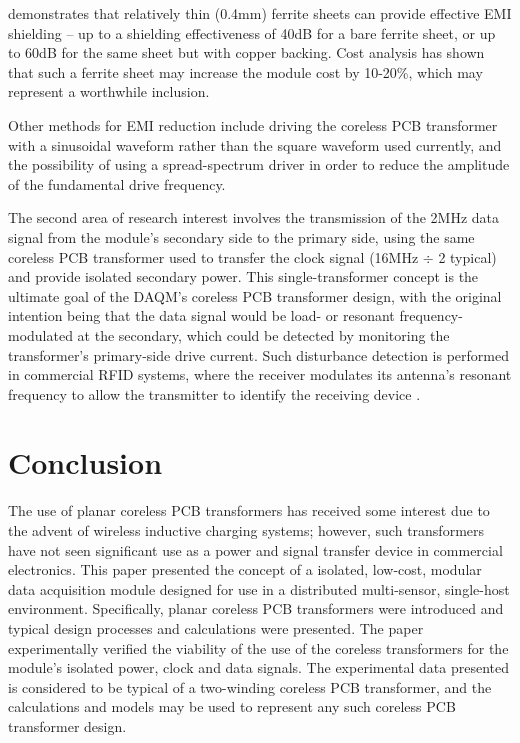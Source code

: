 \documentclass[conference]{IEEEtran}
\begin{document}
\cite{EMIShield} demonstrates that relatively thin (0.4mm) ferrite sheets can provide effective EMI shielding -- up to a shielding effectiveness of 40dB for a bare ferrite sheet, or up to 60dB for the same sheet but with copper backing.  Cost analysis has shown that such a ferrite sheet may increase the module cost by 10-20\%, which may represent a worthwhile inclusion.

Other methods for EMI reduction include driving the coreless PCB transformer with a sinusoidal waveform rather than the square waveform used currently, and the possibility of using a spread-spectrum driver in order to reduce the amplitude of the fundamental drive frequency.

The second area of research interest involves the transmission of the 2MHz data signal from the module's secondary side to the primary side, using the same coreless PCB transformer used to transfer the clock signal (16MHz $ \div $ 2 typical) and provide isolated secondary power.  This single-transformer concept is the ultimate goal of the DAQM's coreless PCB transformer design, with the original intention being that the data signal would be load- or resonant frequency-modulated at the secondary, which could be detected by monitoring the transformer's primary-side drive current.  Such disturbance detection is performed in commercial RFID systems, where the receiver modulates its antenna's resonant frequency to allow the transmitter to identify the receiving device \cite{RFID}.

\section{Conclusion}
The use of planar coreless PCB transformers has received some interest due to the advent of wireless inductive charging systems; however, such transformers have not seen significant use as a power and signal transfer device in commercial electronics.  This paper presented the concept of a isolated, low-cost, modular data acquisition module designed for use in a distributed multi-sensor, single-host environment.  Specifically, planar coreless PCB transformers were introduced and typical design processes and calculations were presented.  The paper experimentally verified the viability of the use of the coreless transformers for the module's isolated power, clock and data signals.  The experimental data presented is considered to be typical of a two-winding coreless PCB transformer, and the calculations and models may be used to represent any such coreless PCB transformer design.  
\end{document}

